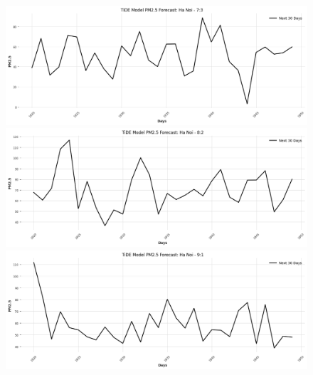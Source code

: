 \begin{figure}[H]

    \centering
    \begin{minipage}{0.15\textwidth}
    \centering
    \end{minipage}
    \hfill

    \begin{minipage}{0.15\textwidth}
    \centering
    \includegraphics[width=1\textwidth]{img/final/TiDE/TiDE_7_3_HN_30D.png}
    \end{minipage}
    \hfill
    \begin{minipage}{0.15\textwidth}
    \centering
    \includegraphics[width=1\textwidth]{img/final/TiDE/TiDE_8_2_HN_30D.png}
    \end{minipage}
    \hfill
    \begin{minipage}{0.15\textwidth}
    \centering
    \includegraphics[width=1\textwidth]{img/final/TiDE/TiDE_9_1_HN_30D.png}
    \end{minipage}
    \hfill


\end{figure}
